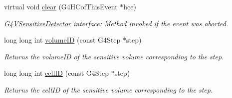\begin{DoxyCompactItemize}
virtual void \hyperlink{class_d_d4hep_1_1_simulation_1_1_geant4_sensitive_a3bb1c2f79261a98e83ec22102281d117}{clear} (G4\+H\+Cof\+This\+Event $\ast$hce)
\begin{DoxyCompactList}\small\item\em \hyperlink{class_g4_v_sensitive_detector}{G4\+V\+Sensitive\+Detector} interface\+: Method invoked if the event was aborted. \end{DoxyCompactList}\item 
long long int \hyperlink{class_d_d4hep_1_1_simulation_1_1_geant4_sensitive_a9aa1270e3fb490a4ebe511343903d72f}{volume\+ID} (const G4\+Step $\ast$step)
\begin{DoxyCompactList}\small\item\em Returns the volume\+ID of the sensitive volume corresponding to the step. \end{DoxyCompactList}\item 
long long int \hyperlink{class_d_d4hep_1_1_simulation_1_1_geant4_sensitive_a1e79173455ccff4d70cd1325b26ad3e9}{cell\+ID} (const G4\+Step $\ast$step)
\begin{DoxyCompactList}\small\item\em Returns the cell\+ID of the sensitive volume corresponding to the step. \end{DoxyCompactList}\end{DoxyCompactItemize}

